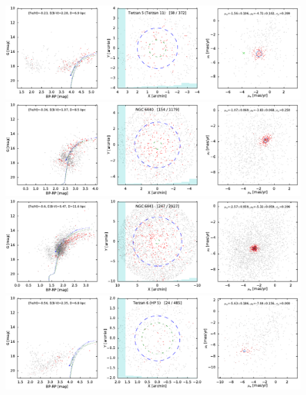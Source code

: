 \documentclass[usenatbib]{mnras}
\begin{document}
\clearpage\begin{figure}
\contcaption{}
\includegraphics{figs/Terzan_5_11.pdf}
\includegraphics{figs/NGC_6440.pdf}
\includegraphics{figs/NGC_6441.pdf}
\includegraphics{figs/Terzan_6_HP_5.pdf}
\end{figure}
\end{document}
